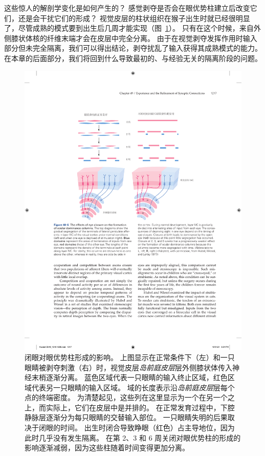 这些惊人的解剖学变化是如何产生的？
感觉剥夺是否会在眼优势柱建立后改变它们，还是会干扰它们的形成？
视觉皮层的柱状组织在猴子出生时就已经很明显了，尽管成熟的模式要到出生后几周才能实现（图~\ref{fig:49_5}）。
只有在这个时候，来自外侧膝状体核的纤维末端才会在皮层中完全分离。
由于在视觉剥夺发挥作用时输入部分但未完全隔离，我们可以得出结论，剥夺扰乱了输入获得其成熟模式的能力。
在本章的后面部分，我们将回到什么导致最初的、与经验无关的隔离阶段的问题。


\begin{figure}[htbp]
	\centering
	\includegraphics[width=0.8\linewidth]{chap49/fig_49_5}
	\caption{闭眼对眼优势柱形成的影响。
		上图显示在正常条件下（左）和一只眼睛被剥夺刺激（右）时，视觉皮层\textit{岛前庭皮层}层外侧膝状体传入神经末梢逐渐分离。
		蓝色区域代表一只眼睛的输入终止区域，红色区域代表另一只眼睛的输入区域。
		域的长度表示沿\textit{岛前庭皮层}层每个点的终端密度。
		为清楚起见，这些列在这里显示为一个在另一个之上，而实际上，它们在皮层中是并排的。
		在正常发育过程中，下腔静脉层逐渐分为每只眼睛的交替输入部位。
		一只眼睛失明的后果取决于闭眼的时间。
		出生时闭合导致睁眼（红色）占主导地位，因为此时几乎没有发生隔离。
		在第 2、3 和 6 周关闭对眼优势柱的形成的影响逐渐减弱，因为这些柱随着时间变得更加分离\cite{hubel1977ferrier}。 }
	\label{fig:49_5}
\end{figure}


